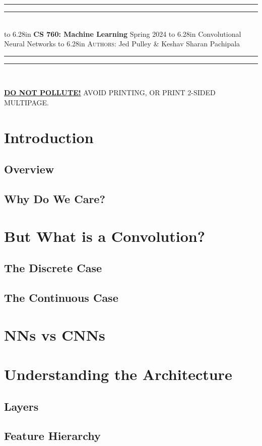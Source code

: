 \documentclass{article}
\newcommand{\lecture}[2]{
\pagestyle{myheadings}
\thispagestyle{plain}
\newpage
\noindent
\begin{center}
\rule{\textwidth}{1.6pt}\vspace*{-\baselineskip}\vspace*{2pt} %
\rule{\textwidth}{0.4pt}\\[1\baselineskip] %
\vbox{\vspace{2mm}
\hbox to 6.28in { {\bf CS 760: Machine Learning} \hfill Spring 2024 }
\vspace{4mm}
\hbox to 6.28in { {\Large \hfill #1  \hfill} }
\vspace{4mm}
\hbox to 6.28in { {\scshape Authors:}  #2 \hfill }}
\vspace{-2mm}
\rule{\textwidth}{0.4pt}\vspace*{-\baselineskip}\vspace{3.2pt} %
\rule{\textwidth}{1.6pt}\\[\baselineskip] %
\end{center}
\vspace*{4mm}
}
\begin{document}
\lecture{Convolutional Neural Networks}{Jed Pulley \& Keshav Sharan Pachipala}

\begin{center}
{\Large {\sf \underline{\textbf{DO NOT POLLUTE!}} AVOID PRINTING, OR PRINT 2-SIDED MULTIPAGE.}}
\end{center}


\section{Introduction}
    \subsection {Overview}
    \subsection {Why Do We Care?}

\section{But What is a Convolution?}
    \subsection {The Discrete Case}
    \subsection {The Continuous Case}

\section{NNs vs CNNs}

\section{Understanding the Architecture}
    \subsection {Layers}
    \subsection {Feature Hierarchy}
    
\end{document}
